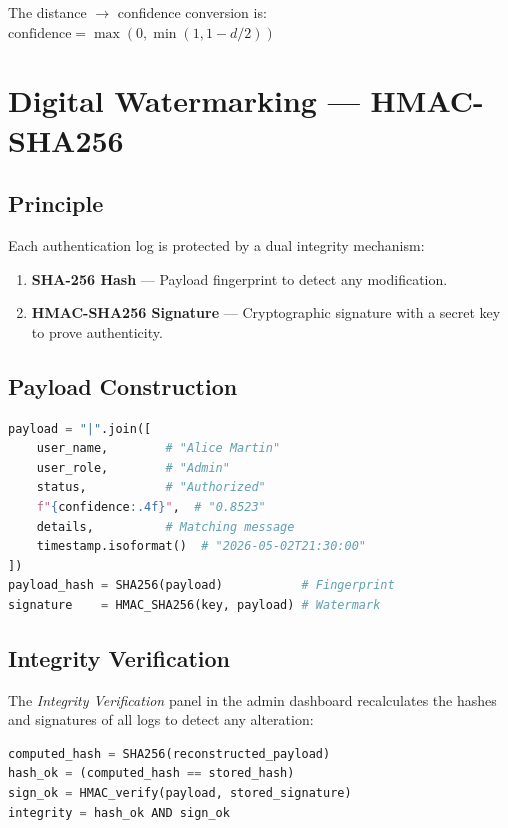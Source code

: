 The distance $\rightarrow$ confidence conversion is: $\text{confidence} = \max(0, \min(1, 1 - d/2))$

\section{Digital Watermarking — HMAC-SHA256}

\subsection{Principle}

Each authentication log is protected by a dual integrity mechanism:

\begin{enumerate}
    \item \textbf{SHA-256 Hash} — Payload fingerprint to detect any modification.
    \item \textbf{HMAC-SHA256 Signature} — Cryptographic signature with a secret key to prove authenticity.
\end{enumerate}

\subsection{Payload Construction}

\begin{lstlisting}[language=Python, caption={Watermarking an authentication log}]
payload = "|".join([
    user_name,        # "Alice Martin"
    user_role,        # "Admin"
    status,           # "Authorized"
    f"{confidence:.4f}",  # "0.8523"
    details,          # Matching message
    timestamp.isoformat()  # "2026-05-02T21:30:00"
])
payload_hash = SHA256(payload)           # Fingerprint
signature    = HMAC_SHA256(key, payload) # Watermark
\end{lstlisting}

\subsection{Integrity Verification}

The \textit{Integrity Verification} panel in the admin dashboard recalculates the hashes and signatures of all logs to detect any alteration:

\begin{lstlisting}[language=Python, caption={Log integrity verification}]
computed_hash = SHA256(reconstructed_payload)
hash_ok = (computed_hash == stored_hash)
sign_ok = HMAC_verify(payload, stored_signature)
integrity = hash_ok AND sign_ok
\end{lstlisting}

